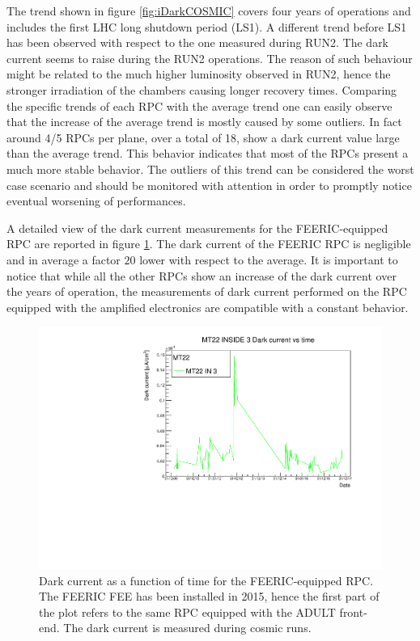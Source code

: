 The trend shown in figure \ref{fig:iDarkCOSMIC} covers four years of operations and includes the first LHC long shutdown period (LS1).
A different trend before LS1 has been observed with respect to the one measured during RUN2.
The dark current seems to raise during the RUN2 operations.
The reason of such behaviour might be related to the much higher luminosity observed in RUN2, hence the stronger irradiation of the chambers causing longer recovery times.
Comparing the specific trends of each RPC with the average trend one can easily observe that the increase of the average trend is mostly caused by some outliers.
In fact around 4/5 RPCs per plane, over a total of 18, show a dark current value large than the average trend.
This behavior indicates that most of the RPCs present a much more stable behavior.
The outliers of this trend can be considered the worst case scenario and should be monitored with attention in order to promptly notice eventual worsening of performances.

A detailed view of the dark current measurements for the FEERIC-equipped RPC are reported in figure \ref{fig:FEERICiDark}.
The dark current of the FEERIC RPC is negligible and in average a factor $20$ lower with respect to the average.
It is important to notice that while all the other RPCs show an increase of the dark current over the years of operation, the measurements of dark current performed on the RPC equipped with the amplified electronics are compatible with a constant behavior.

\begin{figure}[!t]
\begin{center}
\includegraphics[width=0.95\linewidth]{Chapters/Performance/Figs/iDarkFEERIC.pdf}
\caption{Dark current as a function of time for the FEERIC-equipped RPC. The FEERIC FEE has been installed in 2015, hence the first part of the plot refers to the same RPC equipped with the ADULT front-end. The dark current is measured during cosmic runs.}
\label{fig:FEERICiDark}
\end{center}
\end{figure}

